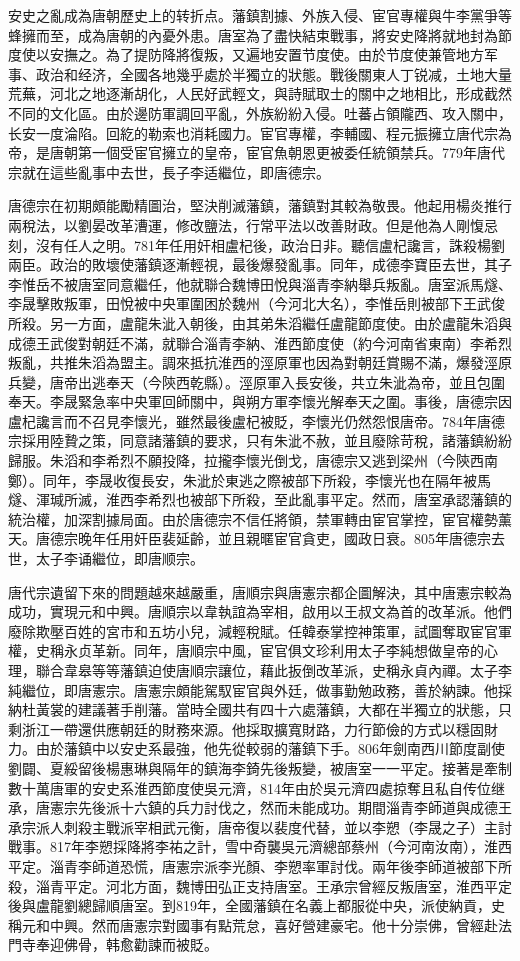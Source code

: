 安史之亂成為唐朝歷史上的转折点。藩鎮割據、外族入侵、宦官專權與牛李黨爭等蜂擁而至，成為唐朝的內憂外患。唐室為了盡快結束戰事，將安史降將就地封為節度使以安撫之。為了提防降將復叛，又遍地安置节度使。由於节度使兼管地方军事、政治和经济，全國各地幾乎處於半獨立的狀態。戰後關東人丁锐减，土地大量荒蕪，河北之地逐漸胡化，人民好武輕文，與詩賦取士的關中之地相比，形成截然不同的文化區。由於邊防軍調回平亂，外族紛紛入侵。吐蕃占領隴西、攻入關中，长安一度淪陷。回紇的勒索也消耗國力。宦官專權，李輔國、程元振擁立唐代宗為帝，是唐朝第一個受宦官擁立的皇帝，宦官魚朝恩更被委任統領禁兵。779年唐代宗就在這些亂事中去世，長子李适繼位，即唐德宗。

唐德宗在初期頗能勵精圖治，堅決削滅藩鎮，藩鎮對其較為敬畏。他起用楊炎推行兩稅法，以劉晏改革漕運，修改鹽法，行常平法以改善財政。但是他為人剛愎忌刻，沒有任人之明。781年任用奸相盧杞後，政治日非。聽信盧杞讒言，誅殺楊劉兩臣。政治的敗壞使藩鎮逐漸輕視，最後爆發亂事。同年，成德李寶臣去世，其子李惟岳不被唐室同意繼任，他就聯合魏博田悅與淄青李納舉兵叛亂。唐室派馬燧、李晟擊敗叛軍，田悅被中央軍圍困於魏州（今河北大名），李惟岳則被部下王武俊所殺。另一方面，盧龍朱泚入朝後，由其弟朱滔繼任盧龍節度使。由於盧龍朱滔與成德王武俊對朝廷不滿，就聯合淄青李納、淮西節度使（約今河南省東南）李希烈叛亂，共推朱滔為盟主。調來抵抗淮西的涇原軍也因為對朝廷賞賜不滿，爆發涇原兵變，唐帝出逃奉天（今陝西乾縣）。涇原軍入長安後，共立朱泚為帝，並且包圍奉天。李晟緊急率中央軍回師關中，與朔方軍李懷光解奉天之圍。事後，唐德宗因盧杞讒言而不召見李懷光，雖然最後盧杞被貶，李懷光仍然怨恨唐帝。784年唐德宗採用陸贄之策，同意諸藩鎮的要求，只有朱泚不赦，並且廢除苛稅，諸藩鎮紛紛歸服。朱滔和李希烈不願投降，拉攏李懷光倒戈，唐德宗又逃到梁州（今陝西南鄭）。同年，李晟收復長安，朱泚於東逃之際被部下所殺，李懷光也在隔年被馬燧、渾瑊所滅，淮西李希烈也被部下所殺，至此亂事平定。然而，唐室承認藩鎮的統治權，加深割據局面。由於唐德宗不信任將領，禁軍轉由宦官掌控，宦官權勢薰天。唐德宗晚年任用奸臣裴延齡，並且親暱宦官貪吏，國政日衰。805年唐德宗去世，太子李诵繼位，即唐顺宗。

唐代宗遺留下來的問題越來越嚴重，唐順宗與唐憲宗都企圖解決，其中唐憲宗較為成功，實現元和中興。唐順宗以韋執誼為宰相，啟用以王叔文為首的改革派。他們廢除欺壓百姓的宮市和五坊小兒，減輕稅賦。任韓泰掌控神策軍，試圖奪取宦官軍權，史稱永贞革新。同年，唐順宗中風，宦官俱文珍利用太子李純想做皇帝的心理，聯合韋皋等等藩鎮迫使唐順宗讓位，藉此扳倒改革派，史稱永貞內禪。太子李純繼位，即唐憲宗。唐憲宗頗能駕馭宦官與外廷，做事勤勉政務，善於納諫。他採納杜黃裳的建議著手削藩。當時全國共有四十六處藩鎮，大都在半獨立的狀態，只剩浙江一帶還供應朝廷的財務來源。他採取擴寬財路，力行節儉的方式以穩固財力。由於藩鎮中以安史系最強，他先從較弱的藩鎮下手。806年劍南西川節度副使劉闢、夏綏留後楊惠琳與隔年的鎮海李錡先後叛變，被唐室一一平定。接著是牽制數十萬唐軍的安史系淮西節度使吳元濟，814年由於吳元濟四處掠奪且私自传位继承，唐憲宗先後派十六鎮的兵力討伐之，然而未能成功。期間淄青李師道與成德王承宗派人刺殺主戰派宰相武元衡，唐帝復以裴度代替，並以李愬（李晟之子）主討戰事。817年李愬採降將李祐之計，雪中奇襲吳元濟總部蔡州（今河南汝南），淮西平定。淄青李師道恐慌，唐憲宗派李光顏、李愬率軍討伐。兩年後李師道被部下所殺，淄青平定。河北方面，魏博田弘正支持唐室。王承宗曾經反叛唐室，淮西平定後與盧龍劉總歸順唐室。到819年，全國藩鎮在名義上都服從中央，派使納貢，史稱元和中興。然而唐憲宗對國事有點荒怠，喜好營建豪宅。他十分崇佛，曾經赴法門寺奉迎佛骨，韩愈勸諫而被貶。

